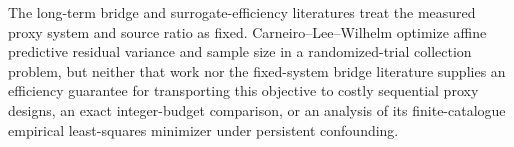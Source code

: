 The long-term bridge and surrogate-efficiency literatures treat the measured proxy system and source ratio as fixed.  Carneiro--Lee--Wilhelm optimize affine predictive residual variance and sample size in a randomized-trial collection problem, but neither that work nor the fixed-system bridge literature supplies an efficiency guarantee for transporting this objective to costly sequential proxy designs, an exact integer-budget comparison, or an analysis of its finite-catalogue empirical least-squares minimizer under persistent confounding.